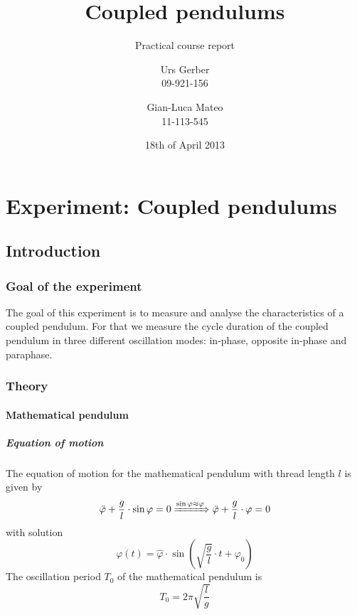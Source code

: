 \documentclass{scrreprt}
\author{Urs Gerber\\09-921-156 \and Gian-Luca Mateo\\11-113-545}
\date{18th of April 2013}
\title{Coupled pendulums}
\subtitle{Practical course report}
\renewcommand{\phi}{\varphi}
\begin{document}
\maketitle

\tableofcontents
\newpage

\chapter{Experiment: Coupled pendulums}

\section{Introduction}

\subsection{Goal of the experiment}
The goal of this experiment is to measure and analyse the characteristics of a coupled pendulum. For that we measure the cycle duration of the coupled pendulum in three different oscillation modes: in-phase, opposite in-phase and paraphase.

\subsection{Theory}

\subsubsection{Mathematical pendulum}
\paragraph{Equation of motion}
The equation of motion for the mathematical pendulum with thread length $l$ is given by
\begin{equation}
\ddot{\phi} + \frac{g}{l} \cdot \sin{\phi} = 0 \xRightarrow{\sin{\phi}\approx\phi} \ddot{\phi} + \frac{g}{l} \cdot \phi = 0
\end{equation}
with solution 
\begin{equation}
\phi (t) = \hat{\phi} \cdot \sin{\left( \sqrt{\frac{g}{l}} \cdot t + \phi_0 \right)} 
\end{equation}
The oscillation period $T_0$ of the mathematical pendulum is
\begin{equation}
T_0 = 2 \pi \sqrt{\frac{l}{g	}}
\end{equation}
\end{document}
